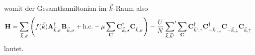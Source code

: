 womit der Gesamthamiltonian im ${\vec{k}}$-Raum also 
\begin{align}
    \oH = \sum_{\vk, \sigma} \left(f(\vk) \oakd \obk + \hc - \mu \sum_\oC \ocd{\vk, \sigma} \oc{\vk, \sigma}\right) - \frac{U}{N} \sump{\vk, \vk'} \sum_\oC  \ocdu \ocdd \ocndd \ocndu~\label{eq:H_aMF}
\end{align}
lautet.


